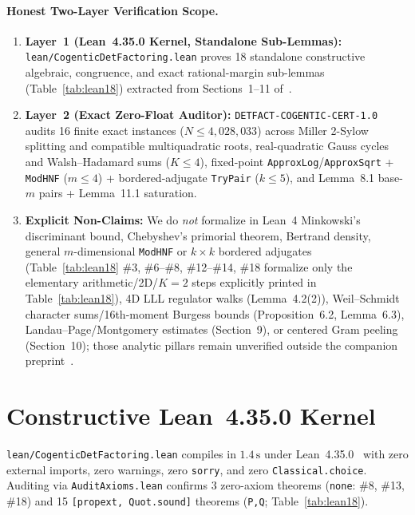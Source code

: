 \documentclass[10pt,twocolumn]{article}
\begin{document}
\paragraph{Honest Two-Layer Verification Scope.}
\begin{enumerate}[leftmargin=1.2em,itemsep=1pt,topsep=2pt]
  \item \textbf{Layer~1 (Lean~4.35.0 Kernel, Standalone Sub-Lemmas):} \texttt{lean/Cogentic\allowbreak DetFactoring.lean} proves 18 standalone constructive algebraic, congruence, and exact rational-margin sub-lemmas (Table~\ref{tab:lean18}) extracted from Sections~1--11 of~\cite{cogentic2026detfactoring}.
  \item \textbf{Layer~2 (Exact Zero-Float Auditor):} \texttt{DETFACT-\allowbreak COGENTIC-\allowbreak CERT-1.0} audits 16 finite exact instances ($N\le 4{,}028{,}033$) across Miller 2-Sylow splitting and compatible multiquadratic roots, real-quadratic Gauss cycles and Walsh--Hadamard sums ($K\le 4$), fixed-point \texttt{ApproxLog}/\texttt{ApproxSqrt} + \texttt{ModHNF} ($m\le 4$) + bordered-adjugate \texttt{TryPair} ($k\le 5$), and Lemma~8.1 base-$m$ pairs + Lemma~11.1 saturation.
  \item \textbf{Explicit Non-Claims:} We do \emph{not} formalize in Lean~4 Minkowski's discriminant bound, Chebyshev's primorial theorem, Bertrand density, general $m$-dimensional \texttt{ModHNF} or $k{\times}k$ bordered adjugates (Table~\ref{tab:lean18} \#3, \#6--\#8, \#12--\#14, \#18 formalize only the elementary arithmetic/2D/$K=2$ steps explicitly printed in Table~\ref{tab:lean18}), 4D LLL regulator walks (Lemma~4.2(2)), Weil--Schmidt character sums\slash 16th-moment Burgess bounds (Proposition~6.2, Lemma~6.3), Landau--Page\slash Montgomery estimates (Section~9), or centered Gram peeling (Section~10); those analytic pillars remain unverified outside the companion preprint~\cite{cogentic2026detfactoring}.
\end{enumerate}

\section{Constructive Lean~4.35.0 Kernel}\label{sec:lean}
\texttt{lean/Cogentic\allowbreak DetFactoring.lean} compiles in $1.4\,\mathrm{s}$ under Lean~4.35.0~\cite{demoura2021lean4} with zero external imports, zero warnings, zero \texttt{sorry}, and zero \texttt{Classical.choice}. Auditing via \texttt{AuditAxioms.lean} confirms 3 zero-axiom theorems (\texttt{none}: \#8, \#13, \#18) and 15 \texttt{[propext, Quot.sound]} theorems (\texttt{P,Q}; Table~\ref{tab:lean18}).
\end{document}
